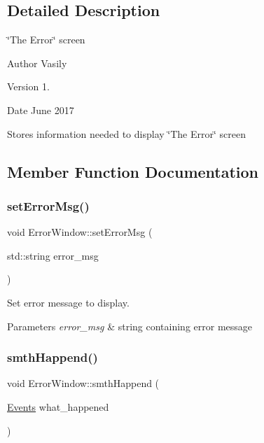 \subsection{Detailed Description}
\char`\"{}\+The Error\char`\"{} screen 

\begin{DoxyAuthor}{Author}
Vasily 
\end{DoxyAuthor}
\begin{DoxyVersion}{Version}
1. 
\end{DoxyVersion}
\begin{DoxyDate}{Date}
June 2017
\end{DoxyDate}
Stores information needed to display \char`\"{}\+The Error\char`\"{} screen 

\subsection{Member Function Documentation}
\mbox{\label{class_error_window_ac5adc252881ca2932b4804a51da44d3e}} 
\subsubsection{\texorpdfstring{set\+Error\+Msg()}{setErrorMsg()}}
{\footnotesize\ttfamily void Error\+Window\+::set\+Error\+Msg (\begin{DoxyParamCaption}\item[{std\+::string}]{error\+\_\+msg }\end{DoxyParamCaption})}



Set error message to display. 


\begin{DoxyParams}{Parameters}
{\em error\+\_\+msg} & string containing error message \\
\hline
\end{DoxyParams}
\mbox{\label{class_error_window_af9096dfdd53c4e788e62ce543f939f01}} 
\subsubsection{\texorpdfstring{smth\+Happend()}{smthHappend()}}
{\footnotesize\ttfamily void Error\+Window\+::smth\+Happend (\begin{DoxyParamCaption}\item[{\hyperlink{_events_8h_af60e00b78607064c5be6aa9397ea49c1}{Events}}]{what\+\_\+happened }\end{DoxyParamCaption})\hspace{0.3cm}{\ttfamily [virtual]}}



